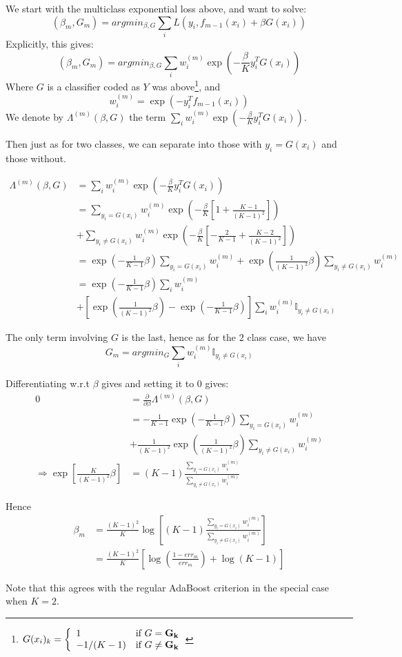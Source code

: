 We start with the multiclass exponential loss above, and want to solve:
$$(\beta_m, G_m) = argmin_{\beta, G} \sum_i  L(y_i, f_{m-1}(x_i) + \beta G(x_i))$$
Explicitly, this gives:
$$ (\beta_m, G_m) = argmin_{\beta, G} \sum_i w_i^{(m)} \exp\left( -\frac{\beta}{K} y_i^T G(x_i) \right)$$
Where $G$ is a classifier coded as $Y$ was above\footnote{$G(x_i)_k = \left\{ \begin{array}{ll} 1 & \mbox{if } G= \mathbf{G_k} \\ -1/(K-1) & \mbox{if }  G \neq \mathbf{G_k} \end{array} \right.$}, and
$$w_i^{(m)} = \exp\left(-y_i^T f_{m-1}(x_i)\right)$$
We denote by $\Lambda^{(m)}(\beta, G)$ the term $\sum_i w_i^{(m)} \exp\left( -\frac{\beta}{K} y_i^T G(x_i) \right)$.

Then just as for two classes, we can separate into those with $y_i = G(x_i)$ and those without.

\begin{align*}
    \Lambda^{(m)}(\beta, G) &= \sum_i w_i^{(m)} \exp\left( -\frac{\beta}{K} y_i^T G(x_i) \right) \\
     &= \sum_{y_i = G(x_i)} w_i^{(m)} \exp\left( -\frac{\beta}{K} \left[1 + \frac{K-1}{(K-1)^2}\right] \right) \\
     &+ \sum_{y_i \neq G(x_i)} w_i^{(m)} \exp\left( -\frac{\beta}{K} \left[-\frac{2}{K-1} + \frac{K-2}{(K-1)^2}\right] \right) \\
     &= \exp\left( -\frac{1}{K-1}\beta \right) \sum_{y_i = G(x_i)} w_i^{(m)}  + \exp\left( \frac{1}{(K-1)^2} \beta \right)  \sum_{y_i \neq G(x_i)} w_i^{(m)} \\
     &= \exp\left( -\frac{1}{K-1}\beta \right) \sum_{i} w_i^{(m)}  \\
     &+ \left[\exp\left( \frac{1}{(K-1)^2} \beta \right) - \exp\left( -\frac{1}{K-1}\beta \right)\right]  \sum_{i} w_i^{(m)} \mathbb{I}_{y_i \neq G(x_i)} 
\end{align*}

The only term involving $G$ is the last, hence as for the $2$ class case, we have
$$ G_m = argmin_G \sum_{i} w_i^{(m)} \mathbb{I}_{y_i \neq G(x_i)} $$

Differentiating w.r.t $\beta$ gives and setting it to $0$ gives:
\begin{align*}
    0 &=\frac{\partial}{\partial \beta} \Lambda^{(m)}(\beta, G) \\
     &= -\frac{1}{K-1} \exp\left( -\frac{1}{K-1}\beta \right) \sum_{y_i = G(x_i)} w_i^{(m)}  \\
     &+ \frac{1}{(K-1)^2}  \exp\left( \frac{1}{(K-1)^2} \beta \right) \sum_{y_i \neq G(x_i)} w_i^{(m)} \\
     \Rightarrow \exp\left[\frac{K}{(K-1)^2} \beta \right] &= (K-1)\frac{\sum_{y_i = G(x_i)} w_i^{(m)}}{\sum_{y_i \neq G(x_i)} w_i^{(m)}} 
\end{align*}

Hence
\begin{align*}
    \beta_m &= \frac{\left(K-1\right)^2}{K} \log\left[(K-1)\frac{\sum_{y_i = G(x_i)} w_i^{(m)}}{\sum_{y_i \neq G(x_i)} w_i^{(m)}}\right] \\
    &= \frac{\left(K-1\right)^2}{K} \left[\log\left(\frac{1 - err_m}{err_m}\right) + \log (K-1) \right]
\end{align*} 

Note that this agrees with the regular AdaBoost criterion in the special case when $K = 2$.
